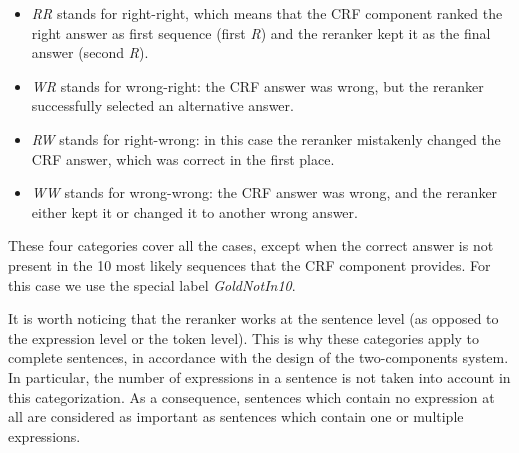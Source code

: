 \documentclass[output=paper
,modfonts
,nonflat]{langsci/langscibook}
\begin{document}
\begin{itemize}
\item {\it RR} stands for right-right, which means that the CRF
  component ranked the right answer as first sequence (first {\it R})
  and the reranker kept it as the final answer (second {\it R}).
\item {\it WR} stands for wrong-right: the CRF answer was wrong, but
  the reranker successfully selected an alternative answer.
\item {\it RW} stands for right-wrong: in this case the reranker
  mistakenly changed the CRF answer, which was correct in the first
  place.
\item {\it WW} stands for wrong-wrong: the CRF answer was wrong, and
  the reranker either kept it or changed it to another wrong answer.
\end{itemize}

These four categories cover all the cases, except when the correct
answer is not present in the 10 most likely sequences that the CRF
component provides. For this case we use the special label {\it
  GoldNotIn10}.

It is worth noticing that the reranker works at the sentence level (as
opposed to the expression level or the token level). This is why these
categories apply to complete sentences, in accordance with the design
of the two-components system. In particular, the number of expressions
in a sentence is not taken into account in this categorization. As a
consequence, sentences which contain no expression at all are
considered as important as sentences which contain one or multiple
expressions.
\end{document}
